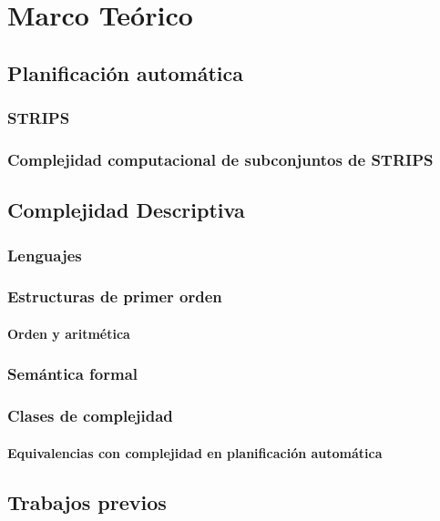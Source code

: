 
\chapter{Marco Teórico}
\label{Chapter1}

\section{Planificación automática}
\subsection{STRIPS}
\subsection{Complejidad computacional de subconjuntos de STRIPS}

\section{Complejidad Descriptiva}
\subsection{Lenguajes}
\subsection{Estructuras de primer orden}
\subsubsection{Orden y aritmética}
\subsection{Semántica formal}
\subsection{Clases de complejidad}
\subsubsection{Equivalencias con complejidad en planificación automática}

\section{Trabajos previos}
